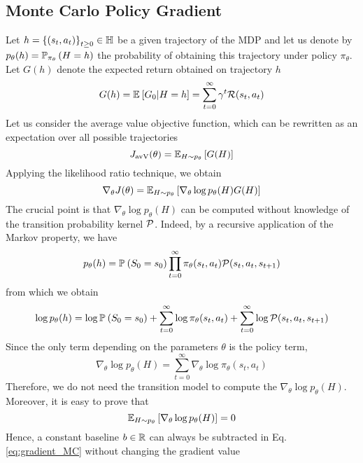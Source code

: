\subsection{Monte Carlo Policy Gradient}
Let $h = {\{(s_t, a_t)\}}_{t\geq 0} \in \H$ be a given trajectory of the MDP and let us 
denote by $p_\theta(h) = \P[\pi_\theta]{H = h}$ the probability of obtaining 
this trajectory under policy $\pi_\theta$. Let $G(h)$ denote the expected return obtained on trajectory $h$
\begin{equation*}
	G(h) = \E{G_0 | H = h} = \sum_{t=0}^\infty \gamma^t \calR(s_t,
	a_t) 
\end{equation*}
Let us consider the average value objective function, which can be rewritten as an expectation over all possible trajectories
\begin{equation*}
	J_{\text{avV}}(\theta) = \E[H \sim p_\theta]{G(H)}
\end{equation*}
Applying the likelihood ratio technique, we obtain
\begin{equation}
\label{eq:gradient_MC}
		\nabla_\theta J(\theta) = \E[H\sim p_\theta]{\nabla_\theta \log p_\theta(H)G(H)}
\end{equation}
The crucial point is that $\nabla_\theta \log p_\theta(H)$ can be computed without
knowledge of the transition probability kernel $\calP$. Indeed, by a recursive application of the Markov property, we have
\begin{equation*}
	p_\theta(h) = \P{S_0 = s_0} \prod_{t=0}^\infty \pi_\theta(s_t, a_t)
	\calP(s_t, a_t, s_{t+1})
\end{equation*}
from which we obtain
\begin{equation*}
	\log p_\theta(h) = \log \P{S_0 = s_0} + \sum_{t=0}^\infty \log 
	\pi_\theta(s_t, a_t) + \sum_{t=0}^\infty \log \calP(s_t, a_t, s_{t+1})
\end{equation*}
Since the only term depending on the parameters $\theta$ is the policy term,
\begin{equation}
	\nabla_\theta \log p_\theta(H) = \sum_{t=0}^\infty \nabla_\theta \log 
	\pi_\theta(s_t, a_t)
\end{equation}
Therefore, we do not need the transition model to compute the $\nabla_\theta \log 
p_\theta(H)$. Moreover, it is easy to prove that
\begin{equation}
\label{eq:likelihood_bias}
	\E[H\sim p_\theta]{\nabla_\theta \log p_\theta(H)} = 0	
\end{equation}
Hence, a constant baseline $b \in \R$ can always be subtracted in Eq. \ref{eq:gradient_MC} without changing the gradient value
